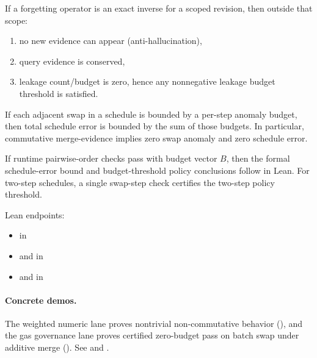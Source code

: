 \documentclass[11pt,openany]{report}
\begin{document}
\begin{theorem}
If a forgetting operator is an exact inverse for a scoped revision, then
outside that scope:
\begin{enumerate}
\item no new evidence can appear (anti-hallucination),
\item query evidence is conserved,
\item leakage count/budget is zero, hence any nonnegative leakage budget
  threshold is satisfied.
\end{enumerate}
\end{theorem}

\begin{theorem}
If each adjacent swap in a schedule is bounded by a per-step anomaly budget,
then total schedule error is bounded by the sum of those budgets.  In
particular, commutative merge-evidence implies zero swap anomaly and zero
schedule error.
\end{theorem}

\begin{theorem}
If runtime pairwise-order checks pass with budget vector $B$, then the
formal schedule-error bound and budget-threshold policy conclusions follow
in Lean.  For two-step schedules, a single swap-step check certifies the
two-step policy threshold.
\end{theorem}

Lean endpoints:
\begin{itemize}
\item {} in
\item {} and
   in
\item {} and
   in
\end{itemize}

\paragraph{Concrete demos.}
The weighted numeric lane proves nontrivial non-commutative behavior
(),
and the gas governance lane proves certified zero-budget pass on batch
swap under additive merge
().
See 
and .
\end{document}
